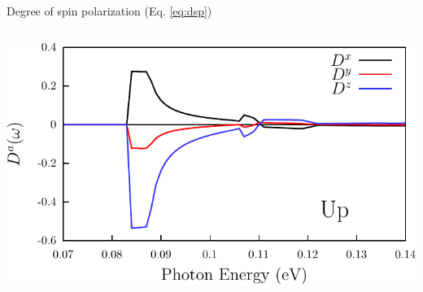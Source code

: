 \documentclass{beamer}
\begin{document}
\begin{frame}

\begin{center}
{\Large Degree of spin polarization {\small (Eq. \ref{eq:dsp})}}
\end{center}

\begin{columns}


\begin{center}
\small 

\vspace{-6mm}
\includegraphics[width=1.0\textwidth]{figs/plots/dsp-up.pdf}

\vspace{-4mm}

\begin{figure}[h!]
\end{figure}
\end{center}
\end{columns}
\end{frame}
\end{document}
